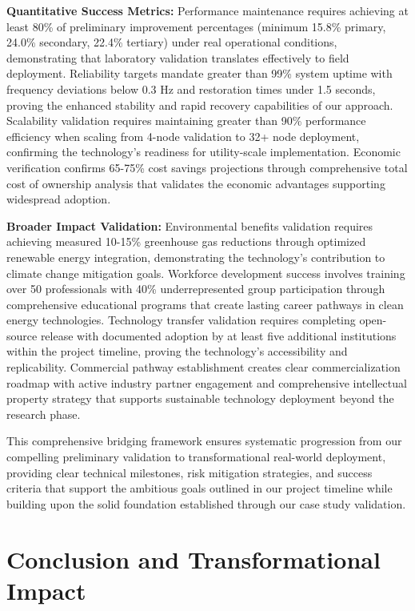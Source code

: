 \documentclass[12pt]{article}
\begin{document}
\textbf{Quantitative Success Metrics:} Performance maintenance requires achieving at least 80\% of preliminary improvement percentages (minimum 15.8\% primary, 24.0\% secondary, 22.4\% tertiary) under real operational conditions, demonstrating that laboratory validation translates effectively to field deployment. Reliability targets mandate greater than 99\% system uptime with frequency deviations below 0.3 Hz and restoration times under 1.5 seconds, proving the enhanced stability and rapid recovery capabilities of our approach. Scalability validation requires maintaining greater than 90\% performance efficiency when scaling from 4-node validation to 32+ node deployment, confirming the technology's readiness for utility-scale implementation. Economic verification confirms 65-75\% cost savings projections through comprehensive total cost of ownership analysis that validates the economic advantages supporting widespread adoption.

\textbf{Broader Impact Validation:} Environmental benefits validation requires achieving measured 10-15\% greenhouse gas reductions through optimized renewable energy integration, demonstrating the technology's contribution to climate change mitigation goals. Workforce development success involves training over 50 professionals with 40\% underrepresented group participation through comprehensive educational programs that create lasting career pathways in clean energy technologies. Technology transfer validation requires completing open-source release with documented adoption by at least five additional institutions within the project timeline, proving the technology's accessibility and replicability. Commercial pathway establishment creates clear commercialization roadmap with active industry partner engagement and comprehensive intellectual property strategy that supports sustainable technology deployment beyond the research phase.

This comprehensive bridging framework ensures systematic progression from our compelling preliminary validation to transformational real-world deployment, providing clear technical milestones, risk mitigation strategies, and success criteria that support the ambitious goals outlined in our project timeline while building upon the solid foundation established through our case study validation.

\section{Conclusion and Transformational Impact}
\end{document}

